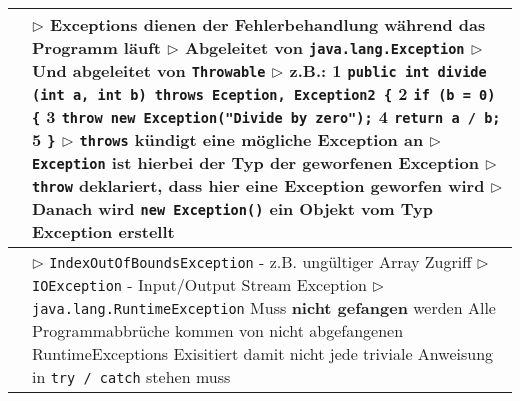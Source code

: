 	\begin{table}[H]
	\label{Exceptions}
	\begin{tabular}{ | p{4cm} p{13.5cm} | }


	\hline
	\makecell[l]{Struktur} & 
	\makecell[l]
	{
	$\rhd$ Exceptions dienen der Fehlerbehandlung während das Programm läuft \\
	$\rhd$ Abgeleitet von \texttt{java.lang.Exception} \\
	$\rhd$ Und abgeleitet von \texttt{Throwable} \\
	$\rhd$ z.B.: \\
	\hspace{0.5cm} 1 \hspace{0.2cm} \texttt{public int divide (int a, int b) throws Eception, Exception2 \{} \\
	\hspace{0.5cm} 2 \hspace{0.4cm} \texttt{if (b = 0) \{} \\
	\hspace{0.5cm} 3 \hspace{0.6cm} \texttt{throw new Exception("Divide by zero");} \\
	\hspace{0.5cm} 4 \hspace{0.4cm} \texttt{return a / b;} \\
	\hspace{0.5cm} 5 \hspace{0.2cm} \texttt{\}} \\
	$\rhd$ \texttt{throws} kündigt eine mögliche Exception an \\
	$\rhd$ \texttt{Exception} ist hierbei der Typ der geworfenen Exception \\
	$\rhd$ \texttt{throw} deklariert, dass hier eine Exception geworfen wird \\
	$\rhd$ Danach wird \texttt{new Exception()} ein Objekt vom Typ Exception erstellt \\
	} 	\\ \hline


	\makecell[l]{Arten} & 
	\makecell[l]
	{
	$\rhd$ \texttt{IndexOutOfBoundsException} \\
	\hspace{0.4cm} - z.B. ungültiger Array Zugriff \\
	$\rhd$ \texttt{IOException} \\ 
	\hspace{0.4cm} - Input/Output Stream Exception \\
	$\rhd$ \texttt{java.lang.RuntimeException} \\
	\hspace{0.4cm} Muss \textbf{nicht gefangen} werden \\
	\hspace{0.4cm} Alle Programmabbrüche kommen von nicht abgefangenen RuntimeExceptions \\
	\hspace{0.4cm} Exisitiert damit nicht jede triviale Anweisung in \texttt{try / catch} stehen muss 
	} 	\\ \hline



\end{tabular}
\end{table}
